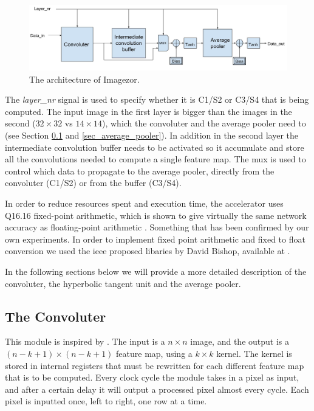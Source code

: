 \begin{figure}[h!]
	\centering
    	\includegraphics[width=1.0\textwidth]{Figures/Method/conv_layer_arch}
  	\caption{The architecture of Imagezor.}
  	\label{fig_imagezor_architecture}
\end{figure}

The \textit{layer\_nr} signal is used to specify whether it is C1/S2 or C3/S4 that is being computed. The input image in the first layer is bigger than the images in the second ($ 32 \times 32 $ vs $ 14 \times 14 $), which the convoluter and the average pooler need to  (see Section \ref{sec_convoluter} and \ref{sec_average_pooler}). In addition in the second layer the intermediate convolution buffer needs to be activated so it accumulate and store all the convolutions needed to compute a single feature map. The mux is used to control which data to propagate to the average pooler, directly from the convoluter (C1/S2) or from the buffer (C3/S4). 

In order to reduce resources spent and execution time, the accelerator uses Q16.16 fixed-point arithmetic, which is shown to give virtually the same network accuracy as floating-point arithmetic\cite{Napocensis2009} \cite{Holt1993} \cite{Chen2014}. Something that has been confirmed by our own experiments. In order to implement fixed point arithmetic and fixed to float conversion we used the ieee proposed libaries by David Bishop, available at \cite{XXXXXXXXXXX}.   

In the following sections below we will provide a more detailed description of the convoluter, the hyperbolic tangent unit and the average pooler. 


\subsection{The Convoluter} \label{sec_convoluter}

This module is inspired by \cite{Farabet2009}. The input is a $ n \times n $ image, and the output is a $ (n-k+1) \times (n-k+1) $ feature map, using a $ k \times k $ kernel. The kernel is stored in internal registers that must be rewritten for each different feature map that is to be computed. Every clock cycle the module takes in a pixel as input, and after a certain delay it will output a processed pixel almost every cycle. Each pixel is inputted once, left to right, one row at a time. 

